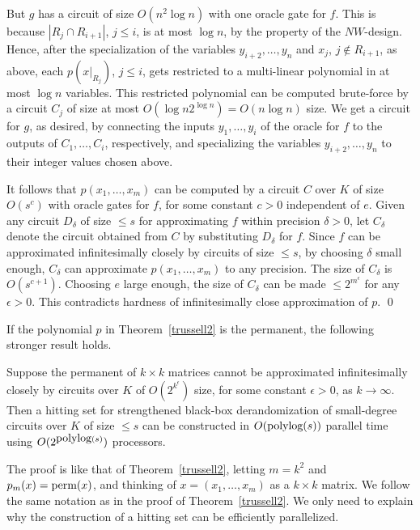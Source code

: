 \documentclass[11pt]{article}
\begin{document}
But $g$ has a circuit of size $O(n^2 \log n)$ with one oracle gate for $f$. 
This is because $|R_j \cap R_{i+1}|$, $j \le i$, is at most $\log n$, by the property of the $NW$-design.
Hence, after the specialization of  the variables $y_{i+2},\ldots,y_n$ and $x_j$, $j \not \in R_{i+1}$, as above, 
each $p(x|_{R_j})$, $j \le i$, gets restricted to a multi-linear polynomial in at most $\log n$ variables. This restricted polynomial
can be computed brute-force by a circuit $C_j$ of size at most $O(\log n 2^{\log n}) = O(n \log n)$ size.
We get a circuit for $g$, as desired, by  connecting  the  inputs $y_1,\ldots,y_i$ of the oracle for $f$ to the outputs of $C_1,\ldots, C_i$,
respectively, and  specializing the variables $y_{i+2},\ldots,y_n$ to their integer values chosen above.

It follows that  $p(x_1,\ldots,x_m)$ can be computed 
by a circuit $C$ over $K$ of size $O(s^c)$ with oracle gates for $f$,
for some constant $c>0$ independent of $e$. Given any circuit $D_\delta$ of size $\le s$ 
for approximating $f$ within precision $\delta >0$, 
let $C_\delta$ denote the circuit obtained from $C$ by substituting $D_\delta$ for $f$.  
Since $f$ can be approximated infinitesimally closely by circuits of size $\le s$,  by choosing $\delta$ small
enough,  $C_\delta$ can  approximate $p(x_1,\ldots,x_m)$ to any precision.
The size of $C_\delta$ is $O(s^{c+1})$.  Choosing $e$ large enough, the size of $C_\delta$ 
can be made $\le 2^{m^\epsilon}$ for any $\epsilon >0$. This contradicts hardness of infinitesimally close approximation of  $p$.
\qed 

If the polynomial $p$ in Theorem~\ref{trussell2} is the permanent, 
the following stronger result holds.

\begin{theorem} \label{trussellperm}
Suppose the permanent of $k\times k$ matrices 
cannot be approximated infinitesimally closely  by   circuits  over $K$ of  $O(2^{k^\epsilon})$ size, for some   constant
$\epsilon >0$, as $k\rightarrow \infty$. 
Then a hitting set for strengthened black-box derandomization of small-degree circuits over $K$ of size $\le s$
can be constructed in $O({\mbox {polylog}}(s))$ parallel time using  $O(2^{{\mbox {polylog}}(s)})$ processors.
\end{theorem}

\proof The proof is  like that of Theorem~\ref{trussell2},
letting $m=k^2$ and $p_m(x)={\mbox {perm}}(x)$, and thinking  of $x=(x_1,\ldots,x_m)$ 
as a $k\times k$ matrix.  We follow the same notation as in the proof of
Theorem~\ref{trussell2}. 
We only need to explain
why the construction of a hitting set can be efficiently parallelized. 
\end{document}
